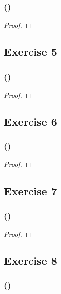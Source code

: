 \documentclass[14pt]{extarticle}
\begin{document}
\subsubsection{()}

\begin{proof}

\end{proof}

\subsection{Exercise 5}

\subsubsection{()}

\begin{proof}

\end{proof}

\subsection{Exercise 6}

\subsubsection{()}

\begin{proof}

\end{proof}

\subsection{Exercise 7}

\subsubsection{()}

\begin{proof}

\end{proof}

\subsection{Exercise 8}

\subsubsection{()}
\end{document}
